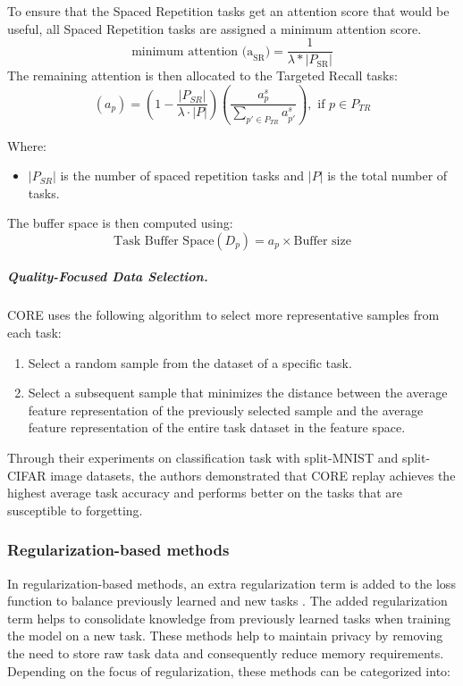 \begin{enumerate}
To ensure that the Spaced Repetition tasks get an attention score that would be useful, all Spaced Repetition tasks are assigned a minimum attention score.
\begin{equation} \label{minimum_attention}
\text{minimum attention (a}_{\text{SR}}\text{)}= \frac{1}{\lambda * |P_{\text{SR}}|}
\end{equation}
The remaining attention is then allocated to the Targeted Recall tasks:
\begin{equation} \label{TRattention}
(a_p) = \left(1 - \frac{|P_{SR}|}{\lambda \cdot |P|}\right) \left(\frac{a_p^s}{\sum_{p' \in P_{TR}} a_{p'}^s}\right), \text{ if } p \in P_{TR}
\end{equation}

Where:
\begin{itemize}
    \item $|P_{SR}|$ is the number of spaced repetition tasks and $|P|$ is the total number of tasks.
\end{itemize}

The buffer space is then computed using:
\begin{equation} \label{bufferspace}
\text{Task Buffer Space}(D_p) = a_p \times \text{Buffer size}
\end{equation}
\end{enumerate}

\subparagraph{Quality-Focused Data Selection.} CORE uses the following algorithm to select more representative samples from each task:
\begin{enumerate}
\item Select a random sample from the dataset of a specific task.
\item Select a subsequent sample that minimizes the distance between the average feature representation of the previously selected sample and the average feature representation of the entire task dataset in the feature space.
\end{enumerate}

Through their experiments on classification task with split-MNIST and split-CIFAR image datasets, the authors demonstrated that CORE replay achieves the highest average task accuracy and performs better on the tasks that are susceptible to forgetting.

\subsubsection{Regularization-based methods}
In regularization-based methods, an extra regularization term is added to the loss function to balance previously learned and new tasks \cite{de2021continual}. The added regularization term helps to consolidate knowledge from previously learned tasks when training the model on a new task. These methods help to maintain privacy by removing the need to store raw task data and consequently reduce memory requirements. Depending on the focus of regularization, these methods can be categorized into:

